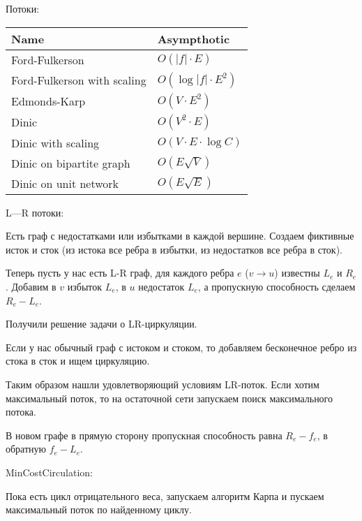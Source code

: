Потоки:
\begin{table}[H]
\centering
\begin{tabular}{|l|l|}
  \hline
  Name                        & Asympthotic                 \\ \hline
  Ford-Fulkerson              & $O(|f| \cdot E)$            \\ \hline
  Ford-Fulkerson with scaling & $O(\log |f| \cdot E^2)$     \\ \hline
  Edmonds-Karp                & $O(V \cdot E^2)$            \\ \hline
  Dinic                       & $O(V^2\cdot E)$             \\ \hline
  Dinic with scaling          & $O(V \cdot E \cdot \log C)$ \\ \hline
  Dinic on bipartite graph    & $O(E \sqrt{V})$             \\ \hline
  Dinic on unit network       & $O(E \sqrt{E})$             \\ \hline
\end{tabular}
\end{table}

L---R потоки:

Есть граф с недостатками или избытками в каждой вершине. Создаем фиктивные исток и сток (из истока все ребра в избытки, из недостатков все ребра в сток).

Теперь пусть у нас есть L-R граф, для каждого ребра $e$ ($v \rightarrow u$) известны $L_e$ и $R_e$. Добавим в $v$ избыток $L_e$, в $u$ недостаток $L_e$, 
а пропускную способность сделаем $R_e - L_e$.

Получили решение задачи о LR-циркуляции.

Если у нас обычный граф с истоком и стоком, то добавляем бесконечное ребро из стока в сток и ищем циркуляцию.

Таким образом нашли удовлетворяющий условиям LR-поток. Если хотим максимальный поток, то на остаточной сети запускаем поиск максимального потока.

В новом графе в прямую сторону пропускная способность равна $R_e - f_e$, в обратную $f_e - L_e$.


MinCostCirculation:

Пока есть цикл отрицательного веса, запускаем алгоритм Карпа и пускаем максимальный поток по найденному циклу.

